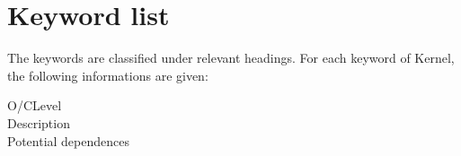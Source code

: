 
%
%
%
%


\section{Keyword list}
\label{sec:prg_motscles}

The keywords are classified under relevant headings. For each keyword of \CS Kernel,
the following informations are given:

\noindent
{}%
%
\makebox[4.cm][l]{[Default]}O/C\hspace{1cm}Level\\
\hspace*{2.5cm}Description\\
\hspace*{2.5cm}Potential dependences


